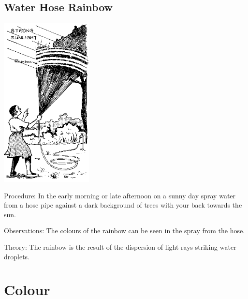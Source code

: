 \begin{multicols}{2}
\subsection{Water Hose Rainbow}

\begin{center}
\includegraphics[width=0.35\textwidth]{./img/source/water-hose-rainbow.png}
\end{center}

\begin{description*}
\item[Procedure:]{In the early morning or late afternoon on a sunny day spray water from a hose pipe against a dark background of trees with your back towards the sun.}
\item[Observations:]{The colours of the rainbow can be seen in the spray from the hose.}
\item[Theory:]{The rainbow is the result of the dispersion of light rays striking water droplets.}
\end{description*}



\section*{Colour} 



\end{multicols}
